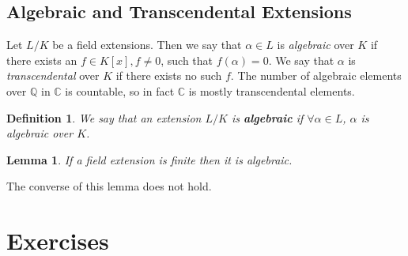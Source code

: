 \documentclass{article}
\theoremstyle{plain}
\newcommand{\Cc}{\mathbb{C}}
\newcommand{\Q}{\mathbb{Q}}
\newtheorem{lemma}[theorem]{Lemma}
\newtheorem*{definition}{Definition}
\theoremstyle{remark}
\begin{document}
    \subsection{Algebraic and Transcendental Extensions}
    Let $L/K$ be a field extensions. Then we say that $\alpha\in L $ is \textit{algebraic} over $K$ if there exists an $f\in K[x], f\neq 0$, such that $f(\alpha)=0$.
    We say that $\alpha$ is \textit{transcendental} over $K$ if there exists no such $f$.
    The number of algebraic elements over $\Q$ in $\Cc$ is countable, so in fact $\Cc$ is mostly transcendental elements.

    \begin{definition}
        We say that an extension $L/K$ is \textbf{algebraic} if $\forall \alpha\in L$, $\alpha$ is algebraic over $K$.
    \end{definition}
    \begin{lemma}
        If a field extension is finite then it is algebraic.
    \end{lemma}
    The converse of this lemma does not hold.

    \newpage
    \section{Exercises}
    
\end{document}
